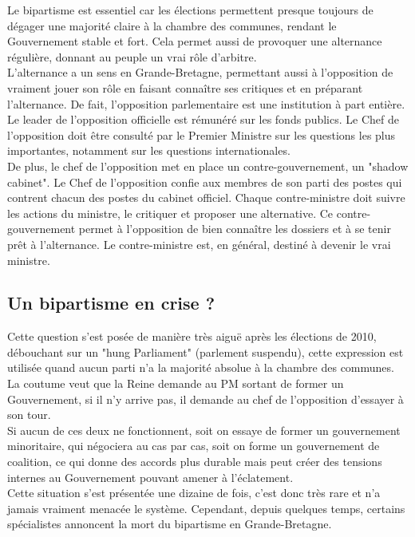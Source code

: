 \documentclass[10pt, a4paper, openany]{book}
\begin{document}
Le bipartisme est essentiel car les élections permettent presque toujours de dégager une majorité claire à la chambre des communes, rendant le Gouvernement stable et fort. Cela permet aussi de provoquer une alternance régulière, donnant au peuple un vrai rôle d'arbitre. \\
L'alternance a un sens en Grande-Bretagne, permettant aussi à l'opposition de vraiment jouer son rôle en faisant connaître ses critiques et en préparant l'alternance. De fait, l'opposition parlementaire est une institution à part entière. Le leader de l'opposition officielle est rémunéré sur les fonds publics. Le Chef de l'opposition doit être consulté par le Premier Ministre sur les questions les plus importantes, notamment sur les questions internationales. \\
De plus, le chef de l'opposition met en place un contre-gouvernement, un "shadow cabinet". Le Chef de l'opposition confie aux membres de son parti des postes qui contrent chacun des postes du cabinet officiel. Chaque contre-ministre doit suivre les actions du ministre, le critiquer et proposer une alternative. Ce contre-gouvernement permet à l'opposition de bien connaître les dossiers et à se tenir prêt à l'alternance. Le contre-ministre est, en général, destiné à devenir le vrai ministre.

\subsection{Un bipartisme en crise ?}

Cette question s'est posée de manière très aiguë après les élections de 2010, débouchant sur un "hung Parliament" (parlement suspendu), cette expression est utilisée quand aucun parti n'a la majorité absolue à la chambre des communes. La coutume veut que la Reine demande au PM sortant de former un Gouvernement, si il n'y arrive pas, il demande au chef de l'opposition d'essayer à son tour. \\
Si aucun de ces deux ne fonctionnent, soit on essaye de former un gouvernement minoritaire, qui négociera au cas par cas, soit on forme un gouvernement de coalition, ce qui donne des accords plus durable mais peut créer des tensions internes au Gouvernement pouvant amener à l'éclatement. \\
Cette situation s'est présentée une dizaine de fois, c'est donc très rare et n'a jamais vraiment menacée le système. Cependant, depuis quelques temps, certains spécialistes annoncent la mort du bipartisme en Grande-Bretagne. 
\end{document}

